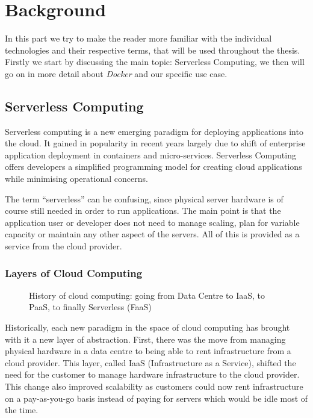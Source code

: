 \section{Background}

In this part we try to make the reader more familiar with the individual technologies and their
respective terms, that will be used throughout the thesis. Firstly we start by discussing the main
topic: Serverless Computing, we then will go on in more detail about \textit{Docker} and our
specific use case.

\subsection{Serverless Computing}

Serverless computing is a new emerging paradigm for deploying applications into the cloud. It gained
in popularity in recent years largely due to shift of enterprise application deployment in
containers and micro-services. Serverless Computing offers developers a simplified programming model
for creating cloud applications while minimising operational concerns. \cite{servprog}

The term “serverless” can be confusing, since physical server hardware is of course still needed in
order to run applications. The main point is that the application user or developer does not need to
manage scaling, plan for variable capacity or maintain any other aspect of the servers. All of this
is provided as a service from the cloud provider. \cite{wikiservcomp}

\subsubsection{Layers of Cloud Computing}

\begin{figure}[H]
  \centering
  \caption{History of cloud computing: going from Data Centre to IaaS, to PaaS, to finally
  Serverless (FaaS) \cite{layercloudcomp}}
\end{figure}

Historically, each new paradigm in the space of cloud computing has brought with it a new layer of
abstraction. First, there was the move from managing physical hardware in a data centre to being
able to rent infrastructure from a cloud provider. This layer, called IaaS (Infrastructure as a
Service), shifted the need for the customer to manage hardware infrastructure to the cloud
provider. This change also improved scalability as customers could now rent infrastructure on a
pay-as-you-go basis instead of paying for servers which would be idle most of the time.

